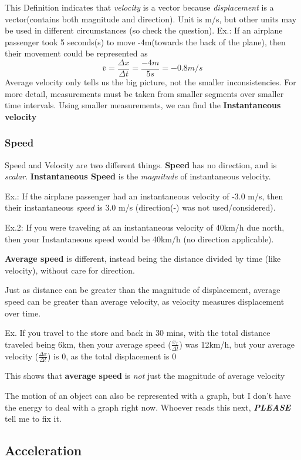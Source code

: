 \documentclass{article}
\begin{document}
This Definition indicates that \emph{velocity} is a vector because \emph{displacement} is a vector(contains both magnitude and direction). Unit is m/s, but other units may be used in different circumstances (so check the question).
Ex.: If an airplane passenger took 5 seconds(s) to move -4m(towards the back of the plane), then their movement could be represented as \[\bar{v} = \frac{\Delta{x}}{\Delta{t}} = \frac{-4 m}{5 s} = -0.8 m/s\]
Average velocity only tells us the big picture, not the smaller inconsistencies. For more detail, measurements must be taken from smaller segments over smaller time intervals.
Using smaller measurements, we can find the \textbf{Instantaneous velocity}

\subsubsection{Speed}
Speed and Velocity are two different things. \textbf{Speed} has no direction, and is \emph{scalar}.
\textbf{Instantaneous Speed} is the \emph{magnitude} of instantaneous velocity.

Ex.: If the airplane passenger had an instantaneous velocity of -3.0 m/s, then their instantaneous \emph{speed} is 3.0 m/s (direction(-) was not used/considered).

Ex.2: If you were traveling at an instantaneous velocity of 40km/h due north, then your Instantaneous speed would be 40km/h (no direction applicable).

\textbf{Average speed} is different, instead being the distance divided by time (like velocity), without care for direction.

Just as distance can be greater than the magnitude of displacement, average speed can be greater than average velocity, as velocity measures displacement over time.

Ex. If you travel to the store and back in 30 mins, with the total distance traveled being 6km, then your average speed ($\frac{x_f}{\Delta{t}}$) was 12km/h, but your average velocity ($\frac{\Delta{x}}{\Delta{t}}$) is 0, as the total displacement is 0

This shows that \textbf{average speed} is \emph{not} just the magnitude of average velocity

The motion of an object can also be represented with a graph, but I don't have the energy to deal with a graph right now. Whoever reads this next, \textbf{\emph{PLEASE}} tell me to fix it.

\subsection{Acceleration}
\end{document}
